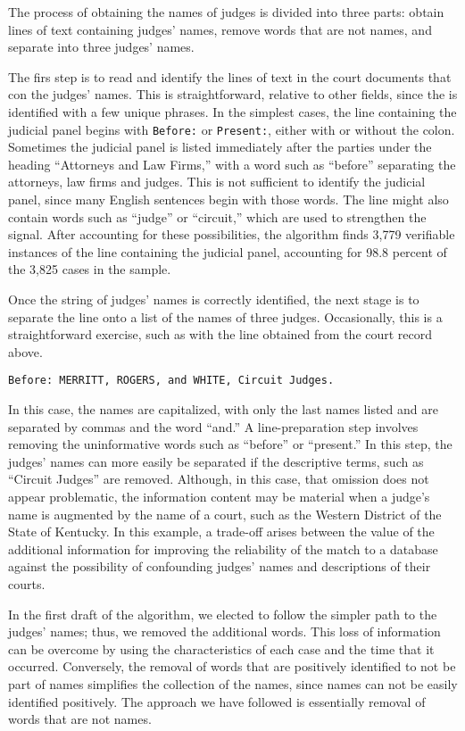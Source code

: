 \documentclass[11pt]{paper}
\begin{document}
The process of obtaining the names of judges is divided into three parts: 
obtain lines of text containing judges' names,
remove words that are not names,
and separate into three judges' names.

The firs step is to read and identify the lines of text in the court documents
that con the judges' names. 
This is straightforward, relative to other fields, 
since the is identified with a few unique phrases. 
In the simplest cases, the line containing the judicial panel 
begins with \texttt{Before:} or \texttt{Present:}, either
with or without the colon. 
Sometimes the judicial panel is listed immediately after the parties
under the heading ``Attorneys and Law Firms,''
with a word such as ``before'' separating the attorneys, law firms and judges. 
This is not sufficient to identify the judicial panel, 
since many English sentences begin with those words. 
The line might also contain words such as ``judge'' or ``circuit,''
which are used to strengthen the signal. 
After accounting for these possibilities, the algorithm finds
3,779 verifiable instances of the line containing the judicial panel, 
accounting for 98.8 percent of the 3,825 cases in the sample. 

Once the string of judges' names is correctly identified, the next
stage is to separate the line onto a list of the names of three judges. 
Occasionally, this is a straightforward exercise, 
such as with the line obtained from the court record above.

\noindent \texttt{Before: MERRITT, ROGERS, and WHITE, Circuit Judges.}

\noindent In this case, the names are capitalized, with only the last names listed
and are separated by commas and the word ``and.''
A line-preparation step involves removing the uninformative words
such as ``before'' or ``present.''
In this step, the judges' names can more easily be separated if 
the descriptive terms, such as ``Circuit Judges'' are removed. 
Although, in this case, that omission does not appear problematic, 
the information content may be material when a judge's name is 
augmented by the name of a court, 
such as the Western District of the State of Kentucky. 
In this example, a trade-off arises between the value of the additional information
for improving the reliability of the match to a database
against the possibility of confounding judges' names and descriptions of their courts. 

In the first draft of the algorithm, we elected to follow the simpler path to the judges' names; 
thus, we removed the additional words. 
This loss of information can be overcome by using the characteristics
of each case and the time that it occurred. 
Conversely, the removal of words that are positively identified 
to not be part of names simplifies the collection of the names, 
since names can not be easily identified positively. 
The approach we have followed is essentially removal of words that are not names. 
\end{document}
